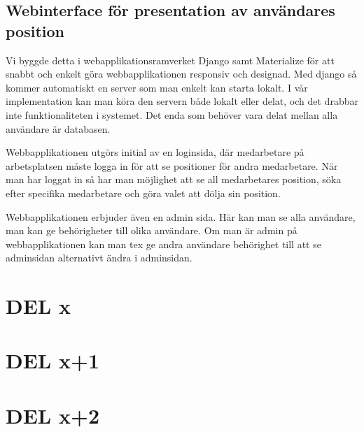 \documentclass[swedish, a4paper,12pt]{article}
\begin{document}
\subsection{Webinterface för presentation av användares position} \label{webinterface}
Vi byggde detta i webapplikationsramverket Django samt Materialize%
för att snabbt och enkelt göra webbapplikationen responsiv och designad. Med django så kommer automatiskt en server som man enkelt kan starta lokalt. I vår implementation kan man köra den servern både lokalt eller delat, och det drabbar inte funktionaliteten i systemet. Det enda som behöver vara delat mellan alla användare är databasen.

Webbapplikationen utgörs initial av en loginsida, där medarbetare på arbetsplatsen måste logga in för att se positioner för andra medarbetare. När man har loggat in så har man möjlighet att se all medarbetares position, söka efter specifika medarbetare och göra valet att dölja sin position.

Webbapplikationen erbjuder även en admin sida. Här kan man se alla användare, man kan ge behörigheter till olika användare. Om man är admin på webbapplikationen kan man tex ge andra användare behörighet till att se adminsidan alternativt ändra i adminsidan.

\iffalse
\section{DEL x}\label{sec:delX}

\section{DEL x+1}
\section{DEL x+2}
\end{document}
